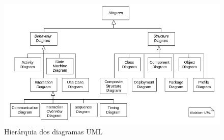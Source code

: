 \documentclass[
	article,			%
	12pt,				%
	openright,
	twoside,			%
	a4paper,			%
	english,			%
	french,
	brazil,				%
	sumario=tradicional
	]{abntex2}
\begin{document}
\begin{figure}
\begin{center}
\includegraphics[scale=0.55]{UML_diagrams_overview.png} 
\caption{Hierárquia dos diagramas UML} \label{fig:uml14dia}
\end{center}
\end{figure}
\end{document}

